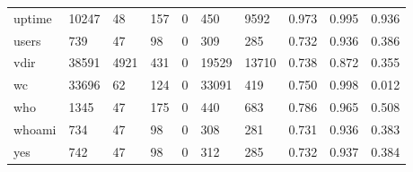 \begin{longtable}{lp{2.0cm}p{2.0cm}p{2.0cm}p{2.0cm}p{2.0cm}p{2.0cm}p{2.0cm}p{2.0cm}p{2.0cm}}
uptime    &                  10247 &                                 48 &                               157 &                                0 &                               450 &                            9592 &                                0.973 &                                  0.995 &                                0.936 \\
users     &                    739 &                                 47 &                                98 &                                0 &                               309 &                             285 &                                0.732 &                                  0.936 &                                0.386 \\
vdir      &                  38591 &                               4921 &                               431 &                                0 &                             19529 &                           13710 &                                0.738 &                                  0.872 &                                0.355 \\
wc        &                  33696 &                                 62 &                               124 &                                0 &                             33091 &                             419 &                                0.750 &                                  0.998 &                                0.012 \\
who       &                   1345 &                                 47 &                               175 &                                0 &                               440 &                             683 &                                0.786 &                                  0.965 &                                0.508 \\
whoami    &                    734 &                                 47 &                                98 &                                0 &                               308 &                             281 &                                0.731 &                                  0.936 &                                0.383 \\
yes       &                    742 &                                 47 &                                98 &                                0 &                               312 &                             285 &                                0.732 &                                  0.937 &                                0.384 \\
\end{longtable}
